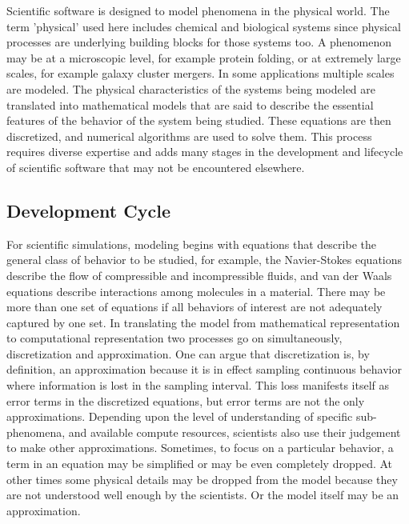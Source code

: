 \label{sec:lifecycle} 
Scientific software is designed to model phenomena in the
physical world. The term 'physical' used here includes chemical and
biological systems since physical processes are underlying building
blocks for those systems too. A phenomenon may be at a microscopic level, for example
protein folding, or at extremely large scales, for example galaxy cluster
mergers.  In some applications multiple scales are modeled.  The physical characteristics of the systems being modeled are
translated into mathematical models that are said to describe the
essential features of the behavior of the system being
studied. These equations are then discretized, and numerical algorithms
are used to solve them. This process requires diverse expertise and
adds many stages in the development and lifecycle of scientific
software that may not be encountered elsewhere. 


\subsection{Development Cycle}
\label{sec:dev-cycle}
For scientific simulations, modeling begins with equations that describe the
general class of behavior to be studied, for example, the Navier-Stokes
equations describe the flow of compressible and incompressible
fluids, and van der Waals equations describe interactions among
molecules in a material. There may be more than one set of equations
if all behaviors of interest are not adequately captured by one set.
In translating the model from mathematical representation to
computational representation two processes go on simultaneously,
discretization and approximation. One can argue that discretization is,
by definition, an approximation because it is in effect sampling
continuous behavior where information is lost in the sampling
interval. This loss manifests itself as error terms in the discretized
equations, but error terms are not the only 
approximations. Depending upon the level of understanding of specific
sub-phenomena, and available compute resources, scientists also 
use their judgement to make other approximations. Sometimes, to focus on a
particular behavior, a term in an equation may be simplified or may be even completely
dropped. At other times some physical details may be dropped
from the model because they are not understood well enough by the
scientists.  Or the model itself may be an approximation.  

